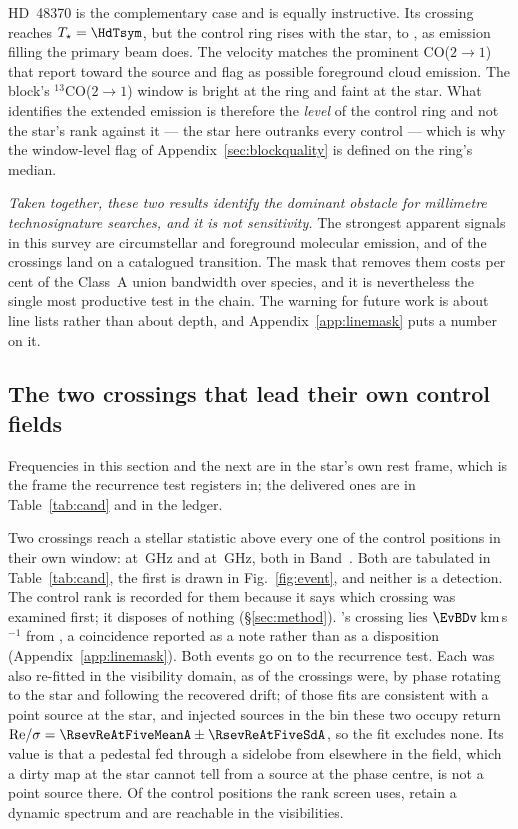 HD~48370 is the complementary case and is equally instructive. Its crossing
reaches $T_\star=\HdTsym$, but the control ring rises with the star, to
\HdRingMax, as emission filling the primary beam does. The velocity matches
the prominent CO($2{\to}1$) that \citet{Cataldi2023} report toward the
source and flag as possible foreground cloud emission. The block's
$^{13}$CO($2{\to}1$) window is bright at the ring and faint at the star.
What identifies the extended emission is therefore the \emph{level} of the
control ring and not the star's rank against it --- the star here outranks
every control --- which is why the window-level flag of
Appendix~\ref{sec:blockquality} is defined on the ring's median.

\emph{Taken together, these two results identify the dominant obstacle for
millimetre technosignature searches, and it is not sensitivity.} The
strongest apparent signals in this survey are circumstellar and foreground
molecular emission, and \NAttributed{} of the \NCross{} crossings land on a
catalogued transition. The mask that removes them costs \MkMaskAPct{} per
cent of the Class~A union bandwidth over \FrNSpec{} species, and it is
nevertheless the single most productive test in the chain. The warning for
future work is about line lists rather than about depth, and
Appendix~\ref{app:linemask} puts a number on it.

\subsection{The two crossings that lead their own control fields}
\label{sec:vistest}

Frequencies in this section and the next are in the star's own rest frame,
which is the frame the recurrence test registers in; the delivered ones are in
Table~\ref{tab:cand} and in the ledger.

Two crossings reach a stellar statistic above every one of the \NCtrl{}
control positions in their own window: \EvAStar{} at \RqFreqSx\,GHz and
\EvBStar{} at \RqFreqCp\,GHz, both in Band~\EvABand. Both are tabulated in
Table~\ref{tab:cand}, the first is drawn in Fig.~\ref{fig:event}, and neither
is a detection. The control rank is recorded for them because it says which
crossing was examined first; it disposes of nothing (\S\ref{sec:method}).
\EvBStar's crossing lies $\EvBDv$\,km\,s$^{-1}$ from \EvBLine, a coincidence
reported as a note rather than as a disposition
(Appendix~\ref{app:linemask}). Both events go on to the recurrence test. Each
was also re-fitted in the visibility domain, as \LgNFit{} of the \NCross{}
crossings were, by phase rotating to the star and following the recovered
drift; \LgNLocalCor{} of those fits are consistent with a point source at the
star, and injected sources in the bin these two occupy return
${\rm Re}/\sigma=\RsevReAtFiveMeanA\pm\RsevReAtFiveSdA$, so the fit excludes
none. Its value is that a pedestal fed through a sidelobe from elsewhere in
the field, which a dirty map at the star cannot tell from a source at the
phase centre, is not a point source there. Of the \NCtrl{} control positions
the rank screen uses, \RcNRetCtrl{} retain a dynamic spectrum and
\RcNVisCtrl{} are reachable in the visibilities.

